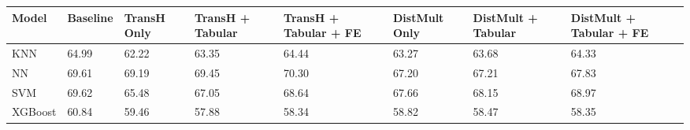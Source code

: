 \begin{tabular}{llllllll}
\toprule
Model & Baseline & TransH Only & TransH + Tabular & TransH + Tabular + FE & DistMult Only & DistMult + Tabular & DistMult + Tabular + FE \\
\midrule
KNN & 64.99 & 62.22 & 63.35 & 64.44 & 63.27 & 63.68 & 64.33 \\
NN & 69.61 & 69.19 & 69.45 & 70.30 & 67.20 & 67.21 & 67.83 \\
SVM & 69.62 & 65.48 & 67.05 & 68.64 & 67.66 & 68.15 & 68.97 \\
XGBoost & 60.84 & 59.46 & 57.88 & 58.34 & 58.82 & 58.47 & 58.35 \\
\bottomrule
\end{tabular}
